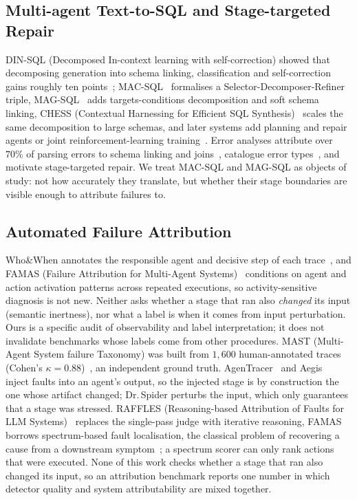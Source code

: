 \documentclass{llncs}
\begin{document}
\subsection{Multi-agent Text-to-SQL and Stage-targeted Repair}
DIN-SQL (Decomposed In-context learning with self-correction) showed that decomposing generation into schema linking, classification
and self-correction gains roughly ten points~\cite{pourreza_din-sql_2023};
MAC-SQL~\cite{wang_mac-sql_2025} formalises a Selector-Decomposer-Refiner
triple, MAG-SQL~\cite{xie_mag-sql_2024} adds targets-conditions
decomposition and soft schema linking, CHESS (Contextual Harnessing for Efficient SQL Synthesis)~\cite{talaei_chess_2024} scales the same decomposition to large
schemas, and later systems add planning and repair agents or joint
reinforcement-learning
training~\cite{chaturvedi_sqlofthought_2025,yang_mars-sql_2025}. Error
analyses attribute over $70\%$ of parsing errors to schema linking and
joins~\cite{zhu_scot2s_2025}, catalogue error
types~\cite{shen_icl_errors_2026}, and motivate stage-targeted repair. We treat MAC-SQL and MAG-SQL as objects of
study: not how accurately they translate, but whether their stage boundaries
are visible enough to attribute failures to.

\subsection{Automated Failure Attribution}

Who\&When annotates the responsible agent and decisive step of each
trace~\cite{zhang2025which}, and FAMAS (Failure Attribution for Multi-Agent Systems)~\cite{ge_famas_2025} conditions on agent and action
activation patterns across repeated executions, so
activity-sensitive diagnosis is not new. Neither asks whether a stage that
ran also \emph{changed} its input (semantic inertness), nor what a label is
when it comes from input perturbation. Ours is a specific audit of
observability and label interpretation; it does not invalidate benchmarks
whose labels come from other procedures. MAST (Multi-Agent System failure Taxonomy) was built from $1{,}600$ human-annotated traces (Cohen's $\kappa = 0.88$)~\cite{cemri_mast_2025}, an
independent ground truth. AgenTracer~\cite{zhang_agentracer_2025} and
Aegis~\cite{kong_aegis_2025} inject faults into an agent's output, so the
injected stage is by construction the one whose artifact changed; Dr.\,Spider
perturbs the input, which only guarantees that a stage was stressed. RAFFLES (Reasoning-based Attribution of Faults for LLM Systems)~\cite{zhu_raffles_2025} replaces the
single-pass judge with iterative reasoning, FAMAS
borrows spectrum-based fault localisation, the classical
problem of recovering a cause from a downstream
symptom~\cite{wong_fault_localization_survey_2016,zeller_delta_debugging_2002};
a spectrum scorer can only rank actions that were executed. None of this
work checks whether a stage that ran also changed its input, so an
attribution benchmark reports one number in which detector quality and system
attributability are mixed together.
\end{document}
